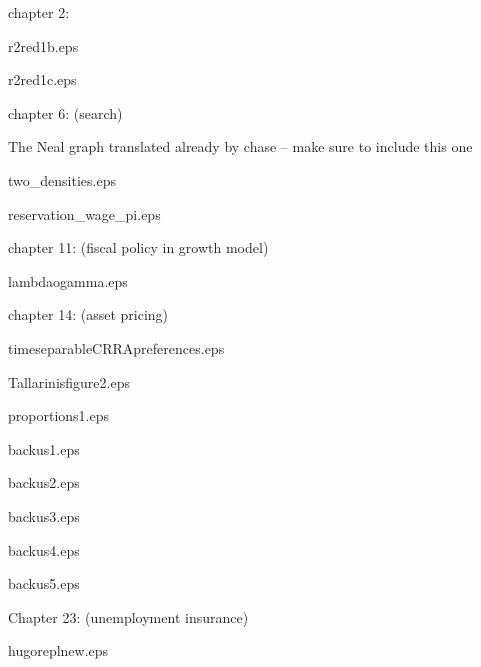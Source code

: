 chapter 2:

   r2red1b.eps
   
   r2red1c.eps
   
chapter 6: (search)

   The Neal graph translated already by chase -- make sure to include this one

   two_densities.eps
   
   reservation_wage_pi.eps
   
chapter 11: (fiscal policy in growth model)

   lambdaogamma.eps
   
chapter 14: (asset pricing)

   timeseparableCRRApreferences.eps
   
   Tallarinisfigure2.eps
   
   proportions1.eps
   
   backus1.eps
   
   backus2.eps
   
   backus3.eps
   
   backus4.eps
   
   backus5.eps 
   
 Chapter 23: (unemployment insurance)
 
    hugoreplnew.eps        